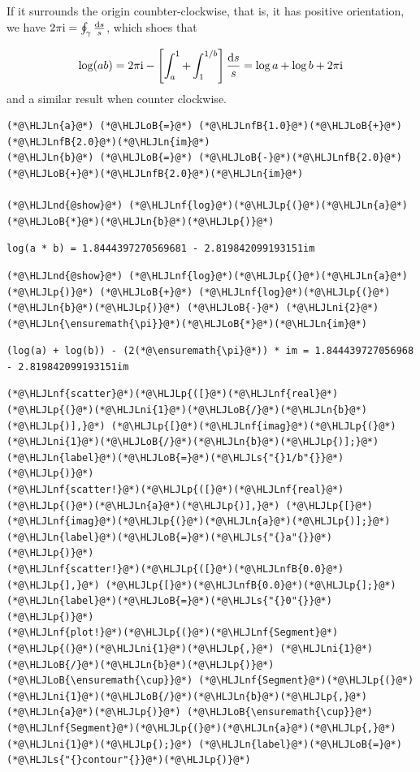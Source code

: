 \documentclass[12pt,a4paper]{article}
\newcommand{\HLJLn}[1]{#1}
\newcommand{\HLJLnd}[1]{\textcolor[RGB]{214,102,97}{#1}}
\newcommand{\HLJLnf}[1]{\textcolor[RGB]{66,102,213}{#1}}
\newcommand{\HLJLs}[1]{\textcolor[RGB]{201,61,57}{#1}}
\newcommand{\HLJLnfB}[1]{\textcolor[RGB]{59,151,46}{#1}}
\newcommand{\HLJLni}[1]{\textcolor[RGB]{59,151,46}{#1}}
\newcommand{\HLJLoB}[1]{\textcolor[RGB]{102,102,102}{\textbf{#1}}}
\newcommand{\HLJLp}[1]{#1}
\def\D{ {\rm d} }
\def\I{ {\rm i} }
\begin{document}
If it surrounds the origin counbter-clockwise, that is, it has positive orientation, we have $2\pi \I = \oint_\gamma {\D s \over s}$, which shoes that 

\[
\log(ab) = 2 \pi \I - \left[\int_a^1 +\int_1^{1/b} \right] {\D s \over s} = \log a + \log b + 2\pi \I
\]
and a similar result when counter clockwise.


\begin{lstlisting}
(*@\HLJLn{a}@*) (*@\HLJLoB{=}@*) (*@\HLJLnfB{1.0}@*)(*@\HLJLoB{+}@*)(*@\HLJLnfB{2.0}@*)(*@\HLJLn{im}@*)
(*@\HLJLn{b}@*) (*@\HLJLoB{=}@*) (*@\HLJLoB{-}@*)(*@\HLJLnfB{2.0}@*)(*@\HLJLoB{+}@*)(*@\HLJLnfB{2.0}@*)(*@\HLJLn{im}@*)

(*@\HLJLnd{@show}@*) (*@\HLJLnf{log}@*)(*@\HLJLp{(}@*)(*@\HLJLn{a}@*)(*@\HLJLoB{*}@*)(*@\HLJLn{b}@*)(*@\HLJLp{)}@*)
\end{lstlisting}

\begin{lstlisting}
log(a * b) = 1.8444397270569681 - 2.819842099193151im
\end{lstlisting}


\begin{lstlisting}
(*@\HLJLnd{@show}@*) (*@\HLJLnf{log}@*)(*@\HLJLp{(}@*)(*@\HLJLn{a}@*)(*@\HLJLp{)}@*) (*@\HLJLoB{+}@*) (*@\HLJLnf{log}@*)(*@\HLJLp{(}@*)(*@\HLJLn{b}@*)(*@\HLJLp{)}@*) (*@\HLJLoB{-}@*) (*@\HLJLni{2}@*)(*@\HLJLn{\ensuremath{\pi}}@*)(*@\HLJLoB{*}@*)(*@\HLJLn{im}@*)
\end{lstlisting}

\begin{lstlisting}
(log(a) + log(b)) - (2(*@\ensuremath{\pi}@*)) * im = 1.844439727056968 - 2.819842099193151im
\end{lstlisting}


\begin{lstlisting}
(*@\HLJLnf{scatter}@*)(*@\HLJLp{([}@*)(*@\HLJLnf{real}@*)(*@\HLJLp{(}@*)(*@\HLJLni{1}@*)(*@\HLJLoB{/}@*)(*@\HLJLn{b}@*)(*@\HLJLp{)],}@*) (*@\HLJLp{[}@*)(*@\HLJLnf{imag}@*)(*@\HLJLp{(}@*)(*@\HLJLni{1}@*)(*@\HLJLoB{/}@*)(*@\HLJLn{b}@*)(*@\HLJLp{)];}@*) (*@\HLJLn{label}@*)(*@\HLJLoB{=}@*)(*@\HLJLs{"{}1/b"{}}@*)(*@\HLJLp{)}@*)
(*@\HLJLnf{scatter!}@*)(*@\HLJLp{([}@*)(*@\HLJLnf{real}@*)(*@\HLJLp{(}@*)(*@\HLJLn{a}@*)(*@\HLJLp{)],}@*) (*@\HLJLp{[}@*)(*@\HLJLnf{imag}@*)(*@\HLJLp{(}@*)(*@\HLJLn{a}@*)(*@\HLJLp{)];}@*) (*@\HLJLn{label}@*)(*@\HLJLoB{=}@*)(*@\HLJLs{"{}a"{}}@*)(*@\HLJLp{)}@*)
(*@\HLJLnf{scatter!}@*)(*@\HLJLp{([}@*)(*@\HLJLnfB{0.0}@*)(*@\HLJLp{],}@*) (*@\HLJLp{[}@*)(*@\HLJLnfB{0.0}@*)(*@\HLJLp{];}@*) (*@\HLJLn{label}@*)(*@\HLJLoB{=}@*)(*@\HLJLs{"{}0"{}}@*)(*@\HLJLp{)}@*)
(*@\HLJLnf{plot!}@*)(*@\HLJLp{(}@*)(*@\HLJLnf{Segment}@*)(*@\HLJLp{(}@*)(*@\HLJLni{1}@*)(*@\HLJLp{,}@*) (*@\HLJLni{1}@*)(*@\HLJLoB{/}@*)(*@\HLJLn{b}@*)(*@\HLJLp{)}@*) (*@\HLJLoB{\ensuremath{\cup}}@*) (*@\HLJLnf{Segment}@*)(*@\HLJLp{(}@*)(*@\HLJLni{1}@*)(*@\HLJLoB{/}@*)(*@\HLJLn{b}@*)(*@\HLJLp{,}@*) (*@\HLJLn{a}@*)(*@\HLJLp{)}@*) (*@\HLJLoB{\ensuremath{\cup}}@*) (*@\HLJLnf{Segment}@*)(*@\HLJLp{(}@*)(*@\HLJLn{a}@*)(*@\HLJLp{,}@*) (*@\HLJLni{1}@*)(*@\HLJLp{);}@*) (*@\HLJLn{label}@*)(*@\HLJLoB{=}@*)(*@\HLJLs{"{}contour"{}}@*)(*@\HLJLp{)}@*)
\end{lstlisting}
\end{document}
